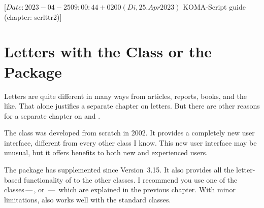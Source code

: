 %
%
%
%
%
%
%

%
                 [$Date: 2023-04-25 09:00:44 +0200 (Di, 25. Apr 2023) $
                  KOMA-Script guide (chapter: scrlttr2)]


\chapter{Letters with the  Class or the 
  Package}

\BeginIndexGroup
{}%
%
Letters are quite different in many ways from articles, reports, books, and
the like. That alone justifies a separate chapter on letters. But there are
other reasons for a separate chapter on  and
.

The  class was developed from
scratch in 2002. It provides a completely new user interface, different from
every other class I know. This new user interface may be unusual, but it
offers benefits to both new and experienced {\KOMAScript} users.

The %
 package has supplemented \KOMAScript{}
since Version~3.15. It also provides all the letter-based functionality of
 to the other classes. I recommend you use one of the
\KOMAScript{} classes\,---\,,  or
\,---\, which are explained in the previous chapter. With
minor limitations,  also works well with the standard
classes.

